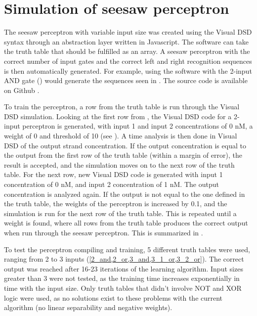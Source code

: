 
\section{Simulation of seesaw perceptron}

The seesaw perceptron with variable input size was created using the Visual DSD syntax through an abstraction layer written in Javascript. The software can take the truth table that should be fulfilled as an array. A seesaw perceptron with the correct number of input gates and the correct left and right recognition sequences is then automatically generated. For example, using the software with the 2-input AND gate () would generate the sequences seen in . The source code is available on Github \cite{neuralcompiler}.

To train the perceptron, a row from the truth table is run through the Visual DSD simulation. Looking at the first row from , the Visual DSD code for a 2-input perceptron is generated, with input 1 and input 2 concentrations of 0 nM, a weight of 0 and threshold of 10 (see ). A time analysis is then done in Visual DSD of the output strand concentration. If the output concentration is equal to the output from the first row of the truth table (within a margin of error), the result is accepted, and the simulation moves on to the next row of the truth table. For the next row, new Visual DSD code is generated with input 1 concentration of 0 nM, and input 2 concentration of 1 nM. The output concentration is analyzed again. If the output is not equal to the one defined in the truth table, the weights of the perceptron is increased by 0.1, and the simulation is run for the next row of the truth table. This is repeated until a weight is found, where all rows from the truth table produces the correct output when run through the seesaw perceptron. This is summarized in .

To test the perceptron compiling and training, 5 different truth tables were used, ranging from 2 to 3 inputs (\cref{2_and,2_or,3_and,3_1_or,3_2_or}). The correct output was reached after 16-23 iterations of the learning algorithm. Input sizes greater than 3 were not tested, as the training time increases exponentially in time with the input size. Only truth tables that didn't involve NOT and XOR logic were used, as no solutions exist to these problems with the current algorithm (no linear separability and negative weights).


